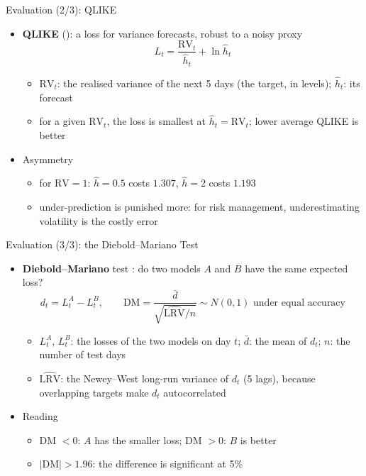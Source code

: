 \begin{frame}{Evaluation (2/3): QLIKE}
\itemsize{\small}
\begin{itemize}
    \item \textbf{QLIKE} (): a loss for variance forecasts, robust to a noisy proxy  \[ L_t = \frac{\mathrm{RV}_t}{\hat h_t} + \ln\hat h_t \]
    \begin{itemize}
        \item $\mathrm{RV}_t$: the realised variance of the next 5 days (the target, in levels); $\hat h_t$: its forecast
        \item for a given $\mathrm{RV}_t$, the loss is smallest at $\hat h_t = \mathrm{RV}_t$; lower average QLIKE is better
    \end{itemize}
    \item Asymmetry
    \begin{itemize}
        \item for $\mathrm{RV} = 1$: $\hat h = 0.5$ costs $1.307$, $\hat h = 2$ costs $1.193$
        \item under-prediction is punished more: for risk management, underestimating volatility is the costly error
    \end{itemize}
\end{itemize}
\end{frame}

\begin{frame}{Evaluation (3/3): the Diebold--Mariano Test}
\itemsize{\small}
\begin{itemize}
    \item \textbf{Diebold--Mariano} test : do two models $A$ and $B$ have the same expected loss? \[ d_t = L_t^{A} - L_t^{B}, \qquad \mathrm{DM} = \frac{\bar d}{\sqrt{\widehat{\mathrm{LRV}}/n}} \sim N(0,1) \text{ under equal accuracy} \]
    \begin{itemize}
        \item $L_t^{A}$, $L_t^{B}$: the losses of the two models on day $t$; $\bar d$: the mean of $d_t$; $n$: the number of test days
        \item $\widehat{\mathrm{LRV}}$: the Newey--West long-run variance of $d_t$ (5 lags), because overlapping targets make $d_t$ autocorrelated
    \end{itemize}
    \item Reading
    \begin{itemize}
        \item DM $< 0$: $A$ has the smaller loss; DM $> 0$: $B$ is better
        \item $|\mathrm{DM}| > 1.96$: the difference is significant at 5\%
    \end{itemize}
\end{itemize}
\end{frame}

